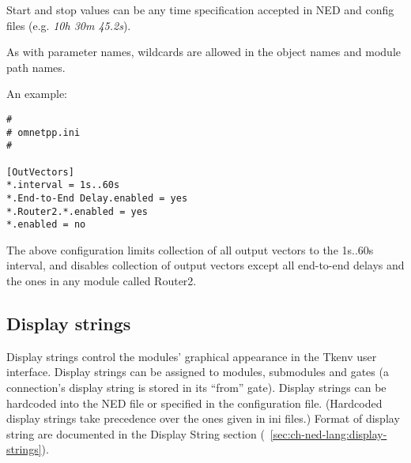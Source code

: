 Start and stop values can be any time specification accepted
in NED and config files (e.g. \textit{10h 30m 45.2s}).


As with parameter names, wildcards are allowed in the object
names and module path names.

An example:

\begin{verbatim}
#
# omnetpp.ini
#

[OutVectors]
*.interval = 1s..60s
*.End-to-End Delay.enabled = yes
*.Router2.*.enabled = yes
*.enabled = no
\end{verbatim}


The above configuration limits collection of all output vectors
to the 1s..60s interval, and disables collection of output vectors
except all end-to-end delays and the ones in any module called Router2.

%
%
%
%
%
%
%
%
%


\subsection{Display strings}
\label{sec:ch-run-sim:displaystrings-section}

Display strings control the modules' graphical
appearance in the Tkenv user interface. Display strings can be
assigned to modules, submodules and gates (a connection's display
string is stored in its ``from'' gate). Display strings can be
hardcoded into the NED file or specified in the configuration file.
(Hardcoded display strings take precedence over the ones given in ini
files.) Format of display string are documented in the Display String
section (~\ref{sec:ch-ned-lang:display-strings}).

